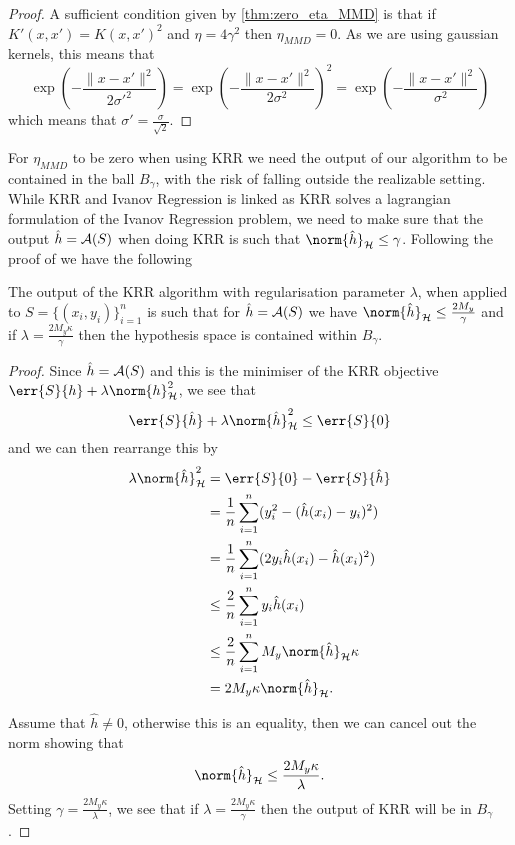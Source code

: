 \begin{proof}
  A sufficient condition given by \ref{thm:zero_eta_MMD} is that if \(K'(x, x') =
  K(x, x')^2\) and \(\eta = 4\gamma^2\) then \(\eta_{MMD} = 0\). As we are using
  gaussian kernels, this means that
  \begin{equation*}
    \exp(- \frac{\|x - x'\|^2}{2\sigma'^2}) = \exp(- \frac{\|x - x'\|^2}{2\sigma^2})^2 = \exp(- \frac{\|x - x'\|^2}{\sigma^2})
  \end{equation*}
  which means that \(\sigma' = \frac{\sigma}{\sqrt{2}}\).
\end{proof}

For \(\eta_{MMD}\) to be zero when using KRR we need the output of our algorithm to be
contained in the ball \(B_{\gamma}\), with the risk of falling outside the
realizable setting. While KRR and Ivanov Regression is linked
as KRR solves a lagrangian formulation of the Ivanov Regression problem, we need
to make sure that the output \(\hat{h} = \mathcal{A}(S)\) when doing KRR is such that
\(\norm{\hat{h}}_{\rkhs{H}} \leq \gamma\). Following the proof of \cite[Lemma
1]{cortes14_domain_adapt_sampl_bias_correc} we have the following
\begin{lemma}
\label{lem:KRR-output-ball-bound} The output of the KRR algorithm with
regularisation parameter \(\lambda\), when applied
to \(S = \{(x_{i}, y_{i})\}_{i=1}^{n}\) is such that for \(\hat{h} = \mathcal{A}(S)\) we have
\(\norm{\hat{h}}_{\rkhs{H}} \leq \frac{2 M_{y}}{\gamma}\) and if \(\lambda =
\frac{2 M_y \kappa}{\gamma}\) then the hypothesis space is contained within
\(B_{\gamma}\).
\end{lemma}
\begin{proof} Since \(\hat{h} = \mathcal{A}(S)\) and this is the minimiser of the KRR
objective \(\err{S}{h} + \lambda \norm{h}^2_{\rkhs{H}}\), we see that
  \begin{equation*} \err{S}{\hat{h}} + \lambda \norm{\hat{h}}_{\rkhs{H}}^2 \leq
\err{S}{0}
  \end{equation*} and we can then rearrange this by
  \begin{align*} \lambda \norm{\hat{h}}_{\rkhs{H}}^2 & = \err{S}{0} -
\err{S}{\hat{h}} \\ & = \frac{1}{n} \sum_{i=1}^n (y_i^2 - (\hat{h}(x_i) -
y_i)^2) \\ & = \frac{1}{n} \sum_{i=1}^n (2 y_i \hat{h}(x_i) - \hat{h}(x_i)^2) \\
& \leq \frac{2}{n} \sum_{i=1}^n y_i \hat{h}(x_i) \\ & \leq \frac{2}{n}
\sum_{i=1}^n M_y \norm{\hat{h}}_{\rkhs{H}} \kappa \\ & = 2 M_y \kappa
\norm{\hat{h}}_{\rkhs{H}}.
  \end{align*}

  Assume that \(\hat{h} \neq 0\), otherwise this is an equality, then we can
cancel out the norm showing that
  \begin{equation}
    \label{eq:KRR-output-ball-bound} \norm{\hat{h}}_{\rkhs{H}} \leq \frac{2 M_y
\kappa}{\lambda}.
  \end{equation} Setting \(\gamma = \frac{2 M_y \kappa}{\lambda}\), we see that
if \(\lambda = \frac{2 M_y \kappa}{\gamma}\) then the output of KRR will be in
\(B_{\gamma}\).
\end{proof}

